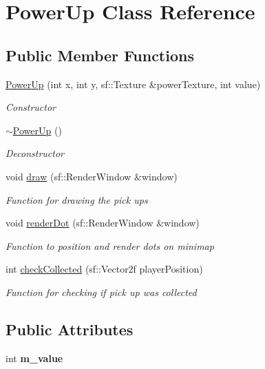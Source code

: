 \hypertarget{class_power_up}{}\section{Power\+Up Class Reference}
\label{class_power_up}
\subsection*{Public Member Functions}
\begin{DoxyCompactItemize}
\item 
\mbox{\hyperlink{class_power_up_adcc7af6ff5706a8d599b9d2f2f01310b}{Power\+Up}} (int x, int y, sf\+::\+Texture \&power\+Texture, int value)
\begin{DoxyCompactList}\small\item\em Constructor \end{DoxyCompactList}\item 
\mbox{\hyperlink{class_power_up_a353053fe27c5a148a2fcd4f5f45e19af}{$\sim$\+Power\+Up}} ()
\begin{DoxyCompactList}\small\item\em Deconstructor \end{DoxyCompactList}\item 
void \mbox{\hyperlink{class_power_up_a79c505ad6dbc8aedeadb7e77a2302503}{draw}} (sf\+::\+Render\+Window \&window)
\begin{DoxyCompactList}\small\item\em Function for drawing the pick ups \end{DoxyCompactList}\item 
void \mbox{\hyperlink{class_power_up_ade426f76b11c172d9f9ec7c600f45d7c}{render\+Dot}} (sf\+::\+Render\+Window \&window)
\begin{DoxyCompactList}\small\item\em Function to position and render dots on minimap \end{DoxyCompactList}\item 
int \mbox{\hyperlink{class_power_up_aaf784386379724c38b88398e512ee3d0}{check\+Collected}} (sf\+::\+Vector2f player\+Position)
\begin{DoxyCompactList}\small\item\em Function for checking if pick up was collected \end{DoxyCompactList}\end{DoxyCompactItemize}
\subsection*{Public Attributes}
\begin{DoxyCompactItemize}
\item 
\mbox{\label{class_power_up_a99b66437f1cf9573ebb1ea5c51c03d6e}} 
int {\bfseries m\+\_\+value}
\end{DoxyCompactItemize}
